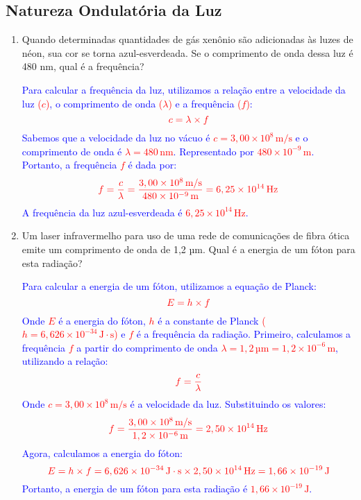 \documentclass[a4paper, 12pt]{article}
\begin{document}
\subsection*{Natureza Ondulatória da Luz}

\begin{enumerate}
	\item Quando determinadas quantidades de gás xenônio são adicionadas às luzes de néon, sua cor se torna azul-esverdeada. Se o comprimento de onda dessa luz é 480 nm, qual é a frequência?
	      
	      \textcolor{blue}{
		      Para calcular a frequência da luz, utilizamos a relação entre a velocidade da luz \textcolor{red}{(\(c\))}, o comprimento de onda \textcolor{red}{(\(\lambda\))} e a frequência \textcolor{red}{(\(f\))}:
		      \[
			      \textcolor{red}{c = \lambda \times f}
		      \]
		      Sabemos que a velocidade da luz no vácuo é \textcolor{red}{\(c = 3,00 \times 10^8 \, \text{m/s}\)} e o comprimento de onda é \textcolor{red}{\(\lambda = 480 \, \text{nm}\)}. Representado por \textcolor{red}{\(480 \times 10^{-9} \, \text{m}\)}. Portanto, a frequência \textcolor{red}{\(f\)} é dada por:
		      \[
			      \textcolor{red}{f = \frac{c}{\lambda} = \frac{3,00 \times 10^8 \, \text{m/s}}{480 \times 10^{-9} \, \text{m}} = 6,25 \times 10^{14} \, \text{Hz}}
		      \]
		      A frequência da luz azul-esverdeada é \textcolor{red}{\(6,25 \times 10^{14} \, \text{Hz}\)}.
	      }
	      
	\item Um laser infravermelho para uso de uma rede de comunicações de fibra ótica emite um comprimento de onda de 1,2 µm. Qual é a energia de um fóton para esta radiação?
	      
	      \textcolor{blue}{
		      Para calcular a energia de um fóton, utilizamos a equação de Planck:
		      \[
			      \textcolor{red}{E = h \times f}
		      \]
		      Onde \textcolor{red}{\(E\)} é a energia do fóton, \textcolor{red}{\(h\)} é a constante de Planck \textcolor{red}{(\(h = 6,626 \times 10^{-34} \, \text{J} \cdot \text{s}\))} e \textcolor{red}{\(f\)} é a frequência da radiação.      
		      Primeiro, calculamos a frequência \textcolor{red}{\(f\)} a partir do comprimento de onda \textcolor{red}{\(\lambda = 1,2 \, \text{µm} = 1,2 \times 10^{-6} \, \text{m}\)}, utilizando a relação:
		      \[
			      \textcolor{red}{f = \frac{c}{\lambda}}
		      \]
		      Onde \textcolor{red}{\(c = 3,00 \times 10^8 \, \text{m/s}\)} é a velocidade da luz. Substituindo os valores:
		      \[
			      \textcolor{red}{f = \frac{3,00 \times 10^8 \, \text{m/s}}{1,2 \times 10^{-6} \, \text{m}} = 2,50 \times 10^{14} \, \text{Hz}}
		      \]
		      Agora, calculamos a energia do fóton:
		      \[
			      \textcolor{red}{E = h \times f = 6,626 \times 10^{-34} \, \text{J} \cdot \text{s} \times 2,50 \times 10^{14} \, \text{Hz} = 1,66 \times 10^{-19} \, \text{J}}
		      \]
		      Portanto, a energia de um fóton para esta radiação é \textcolor{red}{\(1,66 \times 10^{-19} \, \text{J}\)}.
	      }
	      

\end{enumerate}
\end{document}

